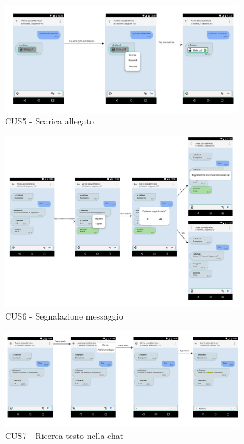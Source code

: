 \begin{figure}
	\centering
	\includegraphics[width=0.9\textwidth]{imgs/gruppo6/activities/act_cus5_scarica_allegato.pdf}
	\caption{CUS5 - Scarica allegato}
	\label{fig:cus5}
\end{figure}

\begin{figure}
	\centering
	\includegraphics[width=0.9\textwidth]{imgs/gruppo6/activities/act_cus6_segnalazione_messaggio.pdf}
	\caption{CUS6 - Segnalazione messaggio}
	\label{fig:cus6}
\end{figure}

\begin{figure}
	\centering
	\includegraphics[width=0.9\textwidth]{imgs/gruppo6/activities/act_cus7_ricerca_testo_nella_chat.pdf}
	\caption{CUS7 - Ricerca testo nella chat}
	\label{fig:cus7}
\end{figure}

